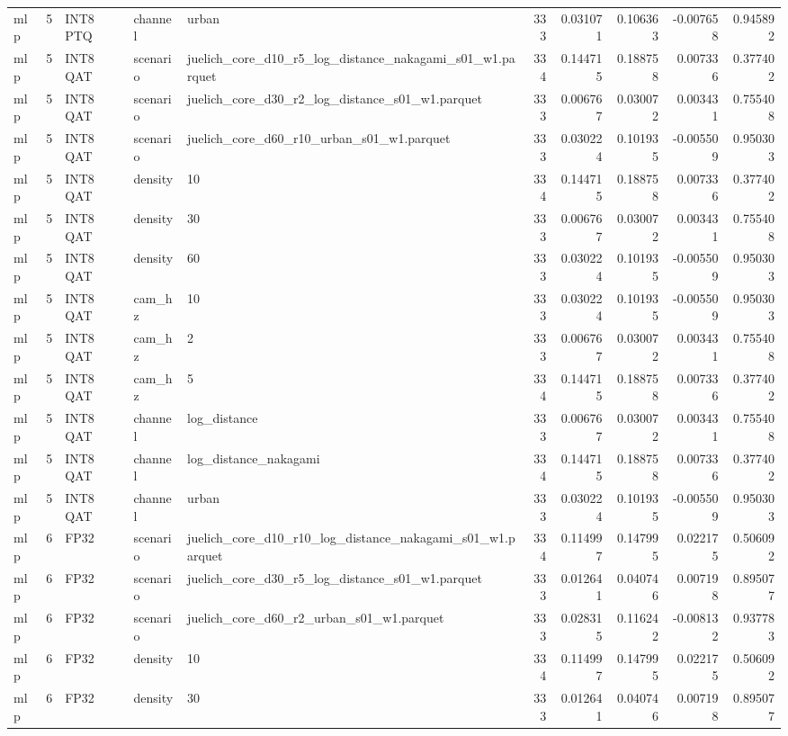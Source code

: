 \begin{tabular}{lrlllrrrrr}
mlp & 5 & INT8 PTQ & channel & urban & 333 & 0.031071 & 0.106363 & -0.007658 & 0.945892 \\
mlp & 5 & INT8 QAT & scenario & juelich\_core\_d10\_r5\_log\_distance\_nakagami\_s01\_w1.parquet & 334 & 0.144715 & 0.188758 & 0.007336 & 0.377402 \\
mlp & 5 & INT8 QAT & scenario & juelich\_core\_d30\_r2\_log\_distance\_s01\_w1.parquet & 333 & 0.006767 & 0.030072 & 0.003431 & 0.755408 \\
mlp & 5 & INT8 QAT & scenario & juelich\_core\_d60\_r10\_urban\_s01\_w1.parquet & 333 & 0.030224 & 0.101935 & -0.005509 & 0.950303 \\
mlp & 5 & INT8 QAT & density & 10 & 334 & 0.144715 & 0.188758 & 0.007336 & 0.377402 \\
mlp & 5 & INT8 QAT & density & 30 & 333 & 0.006767 & 0.030072 & 0.003431 & 0.755408 \\
mlp & 5 & INT8 QAT & density & 60 & 333 & 0.030224 & 0.101935 & -0.005509 & 0.950303 \\
mlp & 5 & INT8 QAT & cam\_hz & 10 & 333 & 0.030224 & 0.101935 & -0.005509 & 0.950303 \\
mlp & 5 & INT8 QAT & cam\_hz & 2 & 333 & 0.006767 & 0.030072 & 0.003431 & 0.755408 \\
mlp & 5 & INT8 QAT & cam\_hz & 5 & 334 & 0.144715 & 0.188758 & 0.007336 & 0.377402 \\
mlp & 5 & INT8 QAT & channel & log\_distance & 333 & 0.006767 & 0.030072 & 0.003431 & 0.755408 \\
mlp & 5 & INT8 QAT & channel & log\_distance\_nakagami & 334 & 0.144715 & 0.188758 & 0.007336 & 0.377402 \\
mlp & 5 & INT8 QAT & channel & urban & 333 & 0.030224 & 0.101935 & -0.005509 & 0.950303 \\
mlp & 6 & FP32 & scenario & juelich\_core\_d10\_r10\_log\_distance\_nakagami\_s01\_w1.parquet & 334 & 0.114997 & 0.147995 & 0.022175 & 0.506092 \\
mlp & 6 & FP32 & scenario & juelich\_core\_d30\_r5\_log\_distance\_s01\_w1.parquet & 333 & 0.012641 & 0.040746 & 0.007198 & 0.895077 \\
mlp & 6 & FP32 & scenario & juelich\_core\_d60\_r2\_urban\_s01\_w1.parquet & 333 & 0.028315 & 0.116242 & -0.008132 & 0.937783 \\
mlp & 6 & FP32 & density & 10 & 334 & 0.114997 & 0.147995 & 0.022175 & 0.506092 \\
mlp & 6 & FP32 & density & 30 & 333 & 0.012641 & 0.040746 & 0.007198 & 0.895077 \\

\end{tabular}
